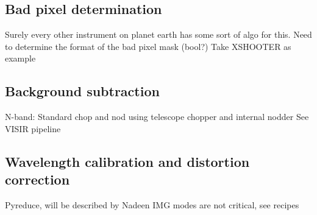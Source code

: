 \subsection{Bad pixel determination}

Surely every other instrument on planet earth has some sort of algo for this.
Need to determine the format of the bad pixel mask (bool?)
Take XSHOOTER as example

\subsection{Background subtraction}

N-band: Standard chop and nod using telescope chopper and internal nodder
See VISIR pipeline

\subsection{Wavelength calibration and distortion correction}

Pyreduce, will be described by Nadeen
IMG modes are not critical, see recipes

